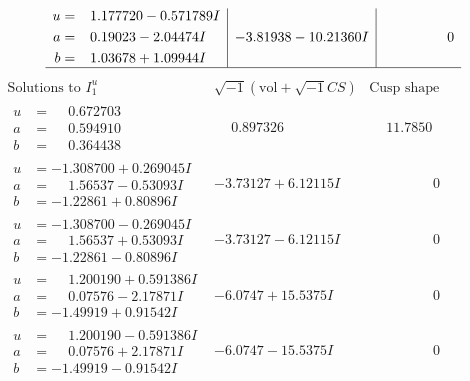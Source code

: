 \documentclass[1p]{elsarticle_modified}
\theoremstyle{definition}
\newcommand{\I}{\sqrt{-1}}
\begin{document}
$$\begin{array}{c|c|c}
\begin{aligned}
u &= \phantom{-}1.177720 - 0.571789 I \\
a &= \phantom{-}0.19023 - 2.04474 I \\
b &= \phantom{-}1.03678 + 1.09944 I\end{aligned}
 & -3.81938 - 10.21360 I & \phantom{-0.000000 } 0\\
 \hline 
 \end{array}$$\newpage$$\begin{array}{c|c|c}  
\text{Solutions to }I^u_{1}& \I (\text{vol} + \sqrt{-1}CS) & \text{Cusp shape}\\
 \hline 
\begin{aligned}
u &= \phantom{-}0.672703\phantom{ +0.000000I} \\
a &= \phantom{-}0.594910\phantom{ +0.000000I} \\
b &= \phantom{-}0.364438\phantom{ +0.000000I}\end{aligned}
 & \phantom{-}0.897326\phantom{ +0.000000I} & \phantom{-}11.7850\phantom{ +0.000000I} \\ \hline\begin{aligned}
u &= -1.308700 + 0.269045 I \\
a &= \phantom{-}1.56537 - 0.53093 I \\
b &= -1.22861 + 0.80896 I\end{aligned}
 & -3.73127 + 6.12115 I & \phantom{-0.000000 } 0 \\ \hline\begin{aligned}
u &= -1.308700 - 0.269045 I \\
a &= \phantom{-}1.56537 + 0.53093 I \\
b &= -1.22861 - 0.80896 I\end{aligned}
 & -3.73127 - 6.12115 I & \phantom{-0.000000 } 0 \\ \hline\begin{aligned}
u &= \phantom{-}1.200190 + 0.591386 I \\
a &= \phantom{-}0.07576 - 2.17871 I \\
b &= -1.49919 + 0.91542 I\end{aligned}
 & -6.0747 + 15.5375 I & \phantom{-0.000000 } 0 \\ \hline\begin{aligned}
u &= \phantom{-}1.200190 - 0.591386 I \\
a &= \phantom{-}0.07576 + 2.17871 I \\
b &= -1.49919 - 0.91542 I\end{aligned}
 & -6.0747 - 15.5375 I & \phantom{-0.000000 } 0 \\ \hline\begin{aligned}

\end{aligned}
\end{array}$$
\end{document}
